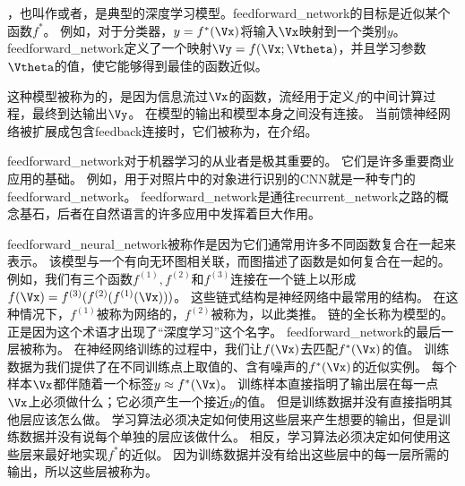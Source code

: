 \chapter{}
\label{chap:deep_feedforward_networks}

，也叫作或者，是典型的深度学习模型。\gls{feedforward_network}的目标是近似某个函数$f^*$。
例如，对于分类器，$y = f^*(\Vx)$将输入$\Vx$映射到一个类别$y$。
\gls{feedforward_network}定义了一个映射$\Vy = f(\Vx; \Vtheta)$，并且学习参数$\Vtheta$的值，使它能够得到最佳的函数近似。

这种模型被称为的，是因为信息流过$\Vx$的函数，流经用于定义$f$的中间计算过程，最终到达输出$\Vy$。
在模型的输出和模型本身之间没有连接。
当前馈神经网络被扩展成包含\gls{feedback}连接时，它们被称为，在介绍。

\gls{feedforward_network}对于机器学习的从业者是极其重要的。
它们是许多重要商业应用的基础。
例如，用于对照片中的对象进行识别的\gls{CNN}就是一种专门的\gls{feedforward_network}。
\gls{feedforward_network}是通往\gls{recurrent_network}之路的概念基石，后者在自然语言的许多应用中发挥着巨大作用。

\gls{feedforward_neural_network}被称作是因为它们通常用许多不同函数复合在一起来表示。
该模型与一个有向无环图相关联，而图描述了函数是如何复合在一起的。
例如，我们有三个函数$f^{(1)}, f^{(2)}$和$f^{(3)}$连接在一个链上以形成$f(\Vx) = f^{(3)}(f^{(2)}(f^{(1)}(\Vx)) )$。
这些链式结构是神经网络中最常用的结构。
在这种情况下，$f^{(1)}$被称为网络的，$f^{(2)}$被称为，以此类推。
链的全长称为模型的。
正是因为这个术语才出现了``深度学习''这个名字。
\gls{feedforward_network}的最后一层被称为。
在神经网络训练的过程中，我们让$f(\Vx)$去匹配$f^*(\Vx)$的值。
训练数据为我们提供了在不同训练点上取值的、含有噪声的$f^*(\Vx)$的近似实例。
每个样本$\Vx$都伴随着一个标签$y\approx f^*(\Vx)$。
训练样本直接指明了输出层在每一点$\Vx$上必须做什么；它必须产生一个接近$y$的值。
但是训练数据并没有直接指明其他层应该怎么做。
学习算法必须决定如何使用这些层来产生想要的输出，但是训练数据并没有说每个单独的层应该做什么。
相反，学习算法必须决定如何使用这些层来最好地实现$f^*$的近似。
因为训练数据并没有给出这些层中的每一层所需的输出，所以这些层被称为。

